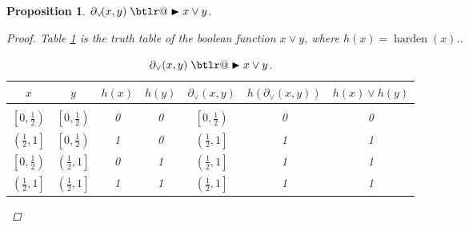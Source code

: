 \documentclass{article}
\makeatletter
\theoremstyle{plain}
\newtheorem{proposition}[theorem]{Proposition}
\theoremstyle{definition}
\theoremstyle{remark}
\DeclareRobustCommand{\btright}{\mathrel{\mathpalette\btlr@\blacktriangleright}}
\newcommand{\btlr@}[2]{%
	\begingroup
	\sbox\z@{$\m@th#1\triangleright$}%
	\sbox\tw@{\resizebox{1.1\wd\z@}{1.1\ht\z@}{\raisebox{\depth}{$\m@th#1\mkern-1mu#2$}}}%
	\ht\tw@=\ht\z@ \dp\tw@=\dp\z@ \wd\tw@=\wd\z@
	\copy\tw@
	\endgroup
}
\makeatother
\begin{document}
\begin{proposition}\label{prop:or}
	$\partial_{\vee}\!(x,y) \btright x \vee y$.
	\begin{proof}
		Table \ref{or-table} is the truth table of the boolean function $x \vee y$, where $h(x) = \operatorname{harden}(x)$..
		\begin{table}[h!]
			\begin{center}
				\begin{tabular}{ccccccc}
					\multicolumn{1}{c}{$x$}  &\multicolumn{1}{c}{$y$}  &\multicolumn{1}{c}{$h(x)$}  &\multicolumn{1}{c}{$h(y)$} &\multicolumn{1}{c}{$\partial_{\vee}(x, y)$} &\multicolumn{1}{c}{$h(\partial_{\vee}(x, y))$}
					&\multicolumn{1}{c}{$h(x) \vee h(y)$}
					\\ \hline \\
					$\left[0, \frac{1}{2}\right)$ & $\left[0, \frac{1}{2}\right)$ & 0 & 0 & $\left[0,\frac{1}{2}\right)$ & 0 & 0\\[0.1cm]
					$\left(\frac{1}{2}, 1\right]$ & $\left[0, \frac{1}{2}\right)$ &1 & 0 & $\left(\frac{1}{2},1\right]$ & 1 & 1\\[0.1cm]
					$\left[0, \frac{1}{2}\right)$ & $\left(\frac{1}{2}, 1\right]$ &0 & 1 & $\left(\frac{1}{2},1\right]$ & 1 & 1\\[0.1cm]
					$\left(\frac{1}{2}, 1\right]$ & $\left(\frac{1}{2}, 1\right]$ &1 & 1 & $\left(\frac{1}{2},1\right]$ & 1 & 1\\[0.1cm]
				\end{tabular}
			\end{center}
			\caption{$\partial_{\vee}(x,y) \btright x \vee y$.}\label{or-table}
		\end{table}			
	\end{proof}
\end{proposition}
\end{document}
